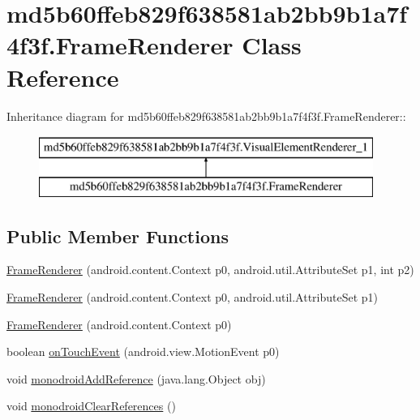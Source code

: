 \hypertarget{classmd5b60ffeb829f638581ab2bb9b1a7f4f3f_1_1_frame_renderer}{
\section{md5b60ffeb829f638581ab2bb9b1a7f4f3f.FrameRenderer Class Reference}
\label{classmd5b60ffeb829f638581ab2bb9b1a7f4f3f_1_1_frame_renderer}
}
Inheritance diagram for md5b60ffeb829f638581ab2bb9b1a7f4f3f.FrameRenderer::\begin{figure}[H]
\begin{center}
\leavevmode
\includegraphics[height=2cm]{classmd5b60ffeb829f638581ab2bb9b1a7f4f3f_1_1_frame_renderer}
\end{center}
\end{figure}
\subsection*{Public Member Functions}
\begin{CompactItemize}
\item 
\hyperlink{classmd5b60ffeb829f638581ab2bb9b1a7f4f3f_1_1_frame_renderer_985beedccde288d3e108b2fbc0ac7eb9}{FrameRenderer} (android.content.Context p0, android.util.AttributeSet p1, int p2)
\item 
\hyperlink{classmd5b60ffeb829f638581ab2bb9b1a7f4f3f_1_1_frame_renderer_b87d8b45ebd480c87ae285c0c10dccc9}{FrameRenderer} (android.content.Context p0, android.util.AttributeSet p1)
\item 
\hyperlink{classmd5b60ffeb829f638581ab2bb9b1a7f4f3f_1_1_frame_renderer_4f57e2437910b58d5918efe5a2232974}{FrameRenderer} (android.content.Context p0)
\item 
boolean \hyperlink{classmd5b60ffeb829f638581ab2bb9b1a7f4f3f_1_1_frame_renderer_86dff6d2f4926a6282df9c47cb59bbcf}{onTouchEvent} (android.view.MotionEvent p0)
\item 
void \hyperlink{classmd5b60ffeb829f638581ab2bb9b1a7f4f3f_1_1_frame_renderer_2178330cfbb272c1b56a10b5cc406576}{monodroidAddReference} (java.lang.Object obj)
\item 
void \hyperlink{classmd5b60ffeb829f638581ab2bb9b1a7f4f3f_1_1_frame_renderer_9122665ff96453c943de70afacc24f32}{monodroidClearReferences} ()
\end{CompactItemize}

